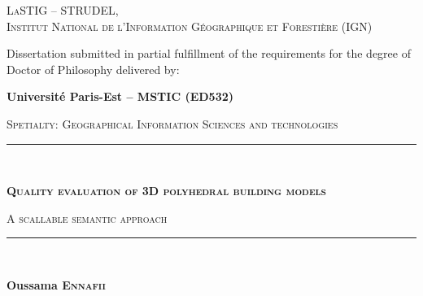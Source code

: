 \begin{titlepage}
    \begin{center}
        

        \vspace*{10mm}

        \begin{minipage}{.5\textwidth}
            \centering
            \textsc{LaSTIG -- STRUDEL,\\ Institut National de l'Information Géographique et Forestière (IGN)}
        \end{minipage}

        \vfill

        Dissertation submitted in partial fulfillment of the requirements for the degree of Doctor of Philosophy delivered by:

        \vspace*{5mm}

        \begin{Large}
            \textbf{Université Paris-Est -- MSTIC (ED532)}
        \end{Large}

        \vspace*{10mm}
        \begin{large}
            \textsc{Spetialty: Geographical Information Sciences and technologies}
        \end{large}
        \vspace*{10mm}

        \rule{\textwidth}{1.5pt}\\
        \begin{LARGE}
            \textsc{\textbf{Quality evaluation of 3D polyhedral building models}}\\
        \end{LARGE}
        \vspace*{2.5mm}
        \begin{Large}
            \textsc{A scallable semantic approach}
        \end{Large}
        \rule{\textwidth}{1.5pt}\\

        \vspace*{10mm}

        \begin{large}
            \textbf{Oussama \textsc{Ennafii}}
        \end{large}


\end{center}
\end{titlepage}
